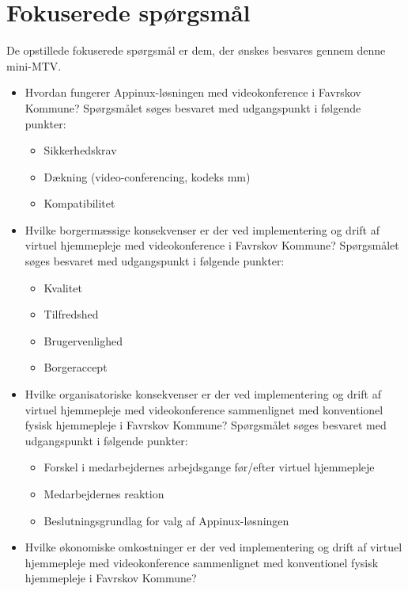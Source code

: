 \section{Fokuserede spørgsmål}
De opstillede fokuserede spørgsmål er dem, der ønskes besvares gennem denne mini-MTV. 

\begin{itemize}
	\item Hvordan fungerer Appinux-løsningen med videokonference i Favrskov Kommune? Spørgsmålet søges besvaret med udgangspunkt i følgende punkter:
	\begin{itemize}
	\item Sikkerhedskrav
	\item Dækning (video-conferencing, kodeks mm)
	\item Kompatibilitet 
\end{itemize}
\end{itemize}

\begin{itemize}
	\item Hvilke borgermæssige konsekvenser er der ved implementering og drift af virtuel hjemmepleje med videokonference i Favrskov Kommune? Spørgsmålet søges besvaret med udgangspunkt i følgende punkter:
	\begin{itemize}
	\item Kvalitet 
	\item Tilfredshed
	\item Brugervenlighed
	\item Borgeraccept
\end{itemize}
\end{itemize}

\begin{itemize}
	\item Hvilke organisatoriske konsekvenser er der ved implementering og drift af virtuel hjemmepleje med videokonference sammenlignet med konventionel fysisk hjemmepleje i Favrskov Kommune? Spørgsmålet søges besvaret med udgangspunkt i følgende punkter:
	\begin{itemize}
	\item Forskel i medarbejdernes arbejdsgange før/efter virtuel hjemmepleje
	\item Medarbejdernes reaktion
	\item Beslutningsgrundlag for valg af Appinux-løsningen 
\end{itemize}
\end{itemize}


\begin{itemize}
	\item Hvilke økonomiske omkostninger er der ved implementering og drift af virtuel hjemmepleje med videokonference sammenlignet med konventionel fysisk hjemmepleje i Favrskov Kommune?
\end{itemize}

